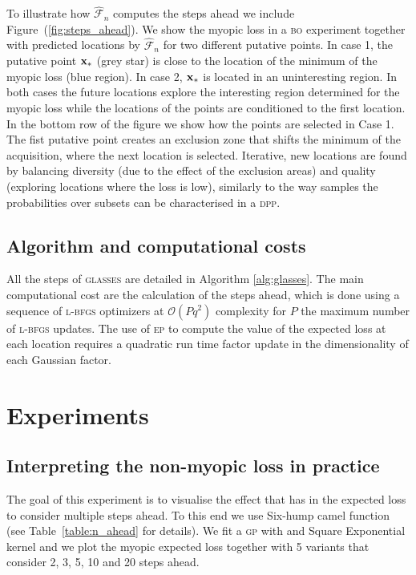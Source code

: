 \documentclass[twoside]{article}
\newcommand{\future}{\mathcal{F}}
\newcommand{\acr}[1]{\textsc{#1}\xspace}
\newcommand{\gp}{\acr{gp}}
\newcommand{\dpp}{\acr{dpp}}
\newcommand{\us}{\acr{glasses}}
\newcommand{\lbfgs}{\acr{l-bfgs}}
\newcommand{\ep}{\acr{ep}}
\newcommand{\bo}{\acr{bo}}
\begin{document}
To illustrate how $\hat{\future}_n$ computes the steps ahead we include Figure~(\ref{fig:steps_ahead}). We show the myopic loss in a \bo experiment together with predicted locations by $\hat{\future}_n$ for two different putative points. In case 1, the putative point $\mathbf{x}_*$ (grey star) is close to the location of the minimum of the myopic loss (blue region). In case 2, $\mathbf{x}_*$ is located in an uninteresting region. In both cases the future locations explore the interesting region determined for the myopic loss while the locations of the points are conditioned to the first location. In the bottom row of the figure we show how the points are selected in Case 1. The fist putative point creates an exclusion zone that shifts the minimum of the acquisition, where the next location is selected. Iterative, new locations are found by balancing diversity (due to the effect of the exclusion areas) and quality (exploring locations where the loss is low), similarly to the way samples the probabilities over subsets can be characterised in a \dpp \citep{MAL-044}.
 

\subsection{Algorithm and computational costs}
All the steps of \us are detailed in Algorithm \ref{alg:glasses}. The main computational cost are the calculation of the steps ahead, which is done using a sequence of \lbfgs optimizers at $\mathcal{O}(Pq^2)$ complexity for $P$ the maximum number of \lbfgs updates. The use of \ep to compute the value of the expected loss at each location requires a  quadratic run  time  factor  update in the dimensionality of each Gaussian factor.

\section{Experiments}\label{sec:experiments}

\subsection{Interpreting the non-myopic loss in practice}
The goal of this experiment is to visualise the effect that has in the expected loss to consider multiple steps ahead. To this end we use Six-hump camel function  (see Table~\ref{table:n_ahead} for details). We fit a \gp with and Square Exponential kernel and we plot the myopic expected loss together with 5 variants that consider 2, 3, 5, 10 and 20 steps ahead. 
\end{document}
